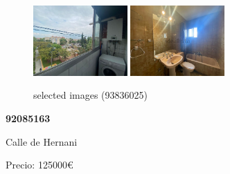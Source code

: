 \documentclass[10pt,a4paper]{report}
\begin{document}
\begin{figure}[htbp]
\includegraphics[width=0.32\textwidth]{arfima/93836025/93836025-005.jpg}
\includegraphics[width=0.32\textwidth]{arfima/93836025/93836025-006.jpg}
\caption{selected images (93836025)}
\end{figure}
\newpage
\begin{center}
\begin{large}
\textbf{92085163}\\[10px]
\end{large}
Calle de Hernani
\end{center}
Precio: 125000€
\end{document}
